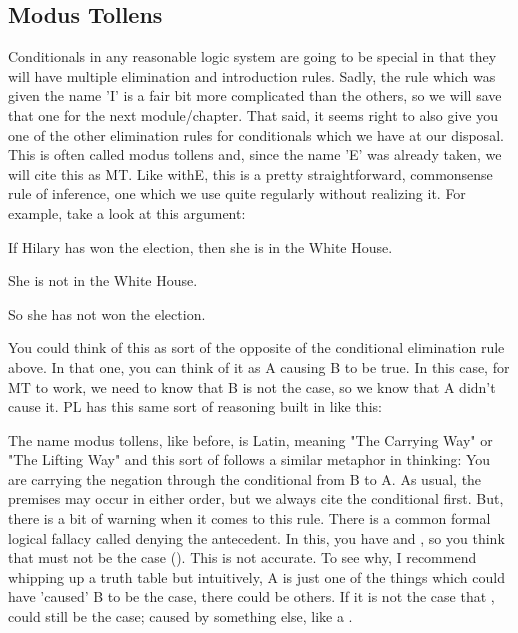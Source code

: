 \subsection{Modus Tollens}

Conditionals in any reasonable logic system are going to be special in that they will have multiple elimination and introduction rules. Sadly, the rule which was given the name '\eif I' is a fair bit more complicated than the others, so we will save that one for the next module/chapter. That said, it seems right to also give you one of the other elimination rules for conditionals which we have at our disposal. This is often called modus tollens and, since the name '\eif E' was already taken, we will cite this as MT. Like with\eif E, this is a pretty straightforward, commonsense rule of inference, one which we use quite regularly without realizing it. For example, take a look at this argument:
\begin{earg}
\item[]If Hilary has won the election, then she is in the White House.
\item[]She is not in the White House.
\item[]So she has not won the election.
\end{earg}
You could think of this as sort of the opposite of the conditional elimination rule above. In that one, you can think of it as A causing B to be true. In this case, for MT to work, we need to know that B is not the case, so we know that A didn't cause it. PL has this same sort of reasoning built in like this:


The name modus tollens, like before, is Latin, meaning "The Carrying Way" or "The Lifting Way" and this sort of follows a similar metaphor in thinking: You are carrying the negation through the conditional from B to A. As usual, the premises may occur in either order, but we always cite the conditional first. But, there is a bit of warning when it comes to this rule. There is a common formal logical fallacy called denying the antecedent. In this, you have \eif {} and \enot {}, so you think that  must not be the case (\enot {}). This is not accurate. To see why, I recommend whipping up a truth table but intuitively, A is just one of the things which could have 'caused' B to be the case, there could be others. If it is not the case that ,  could still be the case; caused by something else, like a .

